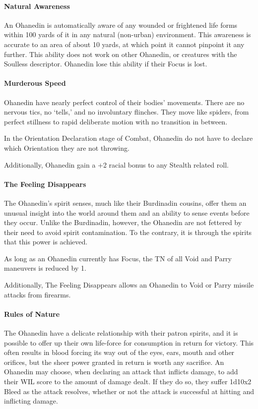 \documentclass[oneside,11pt,english]{book}
\begin{document}
\paragraph{Natural Awareness}
An Ohanedin is automatically aware of any wounded or frightened life forms within 100 yards of 
it in any natural (non-urban) environment. This awareness is accurate to an area of about 10 
yards, at which point it cannot pinpoint it any further. This ability does not work on other 
Ohanedin, or creatures with the Soulless descriptor. Ohanedin lose this ability if their Focus is lost. 
\paragraph{Murderous Speed}
Ohanedin have nearly perfect control of their bodies' movements. There are no nervous tics, no 
‘tells,’ and no involuntary flinches. They move like spiders, from perfect stillness to rapid 
deliberate motion with no transition in between. 


In the Orientation Declaration stage of Combat, Ohanedin do not have to declare which Orientation they are not throwing. 


Additionally, Ohanedin gain a +2 racial bonus to any Stealth related roll. 
\paragraph{The Feeling Disappears}
The Ohanedin's spirit senses, much like their Burdinadin cousins, offer them an unusual insight 
into the world around them and an ability to sense events before they occur. Unlike the Burdinadin, however, the Ohanedin are not fettered by their need to avoid spirit contamination. 
To the contrary, it is through the spirits that this power is achieved. 


As long as an Ohanedin currently has Focus, the TN of all Void and Parry maneuvers is reduced 
by 1. 


Additionally, The Feeling Disappears allows an Ohanedin to Void or Parry missile attacks from 
firearms. 
\paragraph{Rules of Nature}
The Ohanedin have a delicate relationship with their patron spirits, and it is possible to offer up 
their own life-force for consumption in return for victory. This often results in blood forcing its 
way out of the eyes, ears, mouth and other orifices, but the sheer power granted in return is worth 
any sacrifice. An Ohanedin may choose, when declaring an attack that inflicts damage, to add 
their WIL score to the amount of damage dealt. If they do so, they suffer 1d10x2 Bleed as the 
attack resolves, whether or not the attack is successful at hitting and inflicting damage. 
\end{document}
